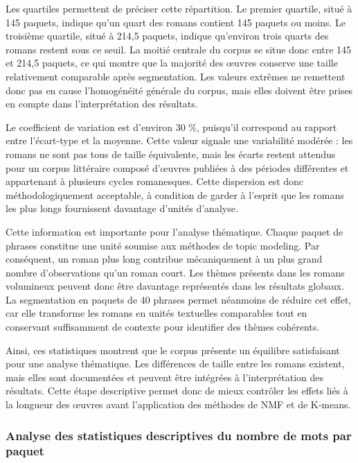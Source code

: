 Les quartiles permettent de préciser cette répartition. Le premier quartile, situé à 145 paquets, indique qu'un quart des romans contient 145 paquets ou moins. Le troisième quartile, situé à 214,5 paquets, indique qu'environ trois quarts des romans restent sous ce seuil. La moitié centrale du corpus se situe donc entre 145 et 214,5 paquets, ce qui montre que la majorité des œuvres conserve une taille relativement comparable après segmentation. Les valeurs extrêmes ne remettent donc pas en cause l'homogénéité générale du corpus, mais elles doivent être prises en compte dans l'interprétation des résultats.

Le coefficient de variation est d'environ 30 \%, puisqu'il correspond au rapport entre l'écart-type et la moyenne. Cette valeur signale une variabilité modérée : les romans ne sont pas tous de taille équivalente, mais les écarts restent attendus pour un corpus littéraire composé d'œuvres publiées à des périodes différentes et appartenant à plusieurs cycles romanesques. Cette dispersion est donc méthodologiquement acceptable, à condition de garder à l'esprit que les romans les plus longs fournissent davantage d'unités d'analyse.

Cette information est importante pour l'analyse thématique. Chaque paquet de phrases constitue une unité soumise aux méthodes de topic modeling. Par conséquent, un roman plus long contribue mécaniquement à un plus grand nombre d'observations qu'un roman court. Les thèmes présents dans les romans volumineux peuvent donc être davantage représentés dans les résultats globaux. La segmentation en paquets de 40 phrases permet néanmoins de réduire cet effet, car elle transforme les romans en unités textuelles comparables tout en conservant suffisamment de contexte pour identifier des thèmes cohérents.

Ainsi, ces statistiques montrent que le corpus présente un équilibre satisfaisant pour une analyse thématique. Les différences de taille entre les romans existent, mais elles sont documentées et peuvent être intégrées à l'interprétation des résultats. Cette étape descriptive permet donc de mieux contrôler les effets liés à la longueur des œuvres avant l'application des méthodes de NMF et de K-means.

\subsubsection{Analyse des statistiques descriptives du nombre de mots par paquet}

